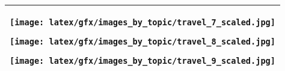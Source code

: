 \begin{table*}[ht]
\begin{tabular}{c}
\begin{minipage}{0.08\textwidth}
                        \centering
                        \texttt{[image: latex/gfx/images\_by\_topic/travel\_7\_scaled.jpg]}
                    \end{minipage}
                    \begin{minipage}{0.08\textwidth}
                        \centering
                        \texttt{[image: latex/gfx/images\_by\_topic/travel\_8\_scaled.jpg]}
                    \end{minipage}
                    \begin{minipage}{0.08\textwidth}
                        \centering
                        \texttt{[image: latex/gfx/images\_by\_topic/travel\_9\_scaled.jpg]}
                    \end{minipage}
                \\
         \bottomrule   
    \end{tabular}
\end{table*}